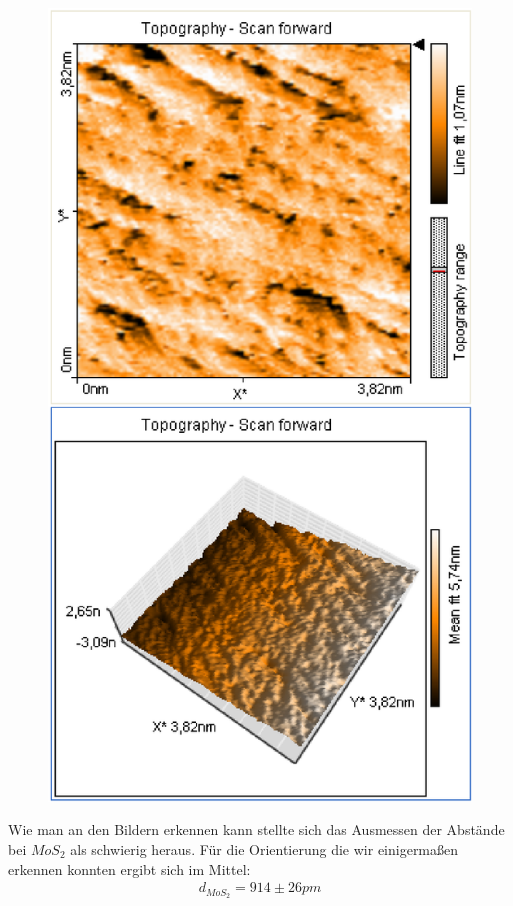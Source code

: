 \documentclass[12pt]{article}
\begin{document}
\begin{figure}[H]
\begin{minipage}{0.4\linewidth}
\includegraphics[width=0.9\linewidth]{../plot/data/mos2/mos29.eps}
\end{minipage}
\end{figure}

Wie man an den Bildern erkennen kann stellte sich das Ausmessen der Abstände bei $MoS_2$ als schwierig heraus. Für die Orientierung die wir einigermaßen erkennen konnten ergibt sich im Mittel:
\begin{align*}
 d_{MoS_2} = 914 \pm 26 pm
\end{align*}
\end{document}
